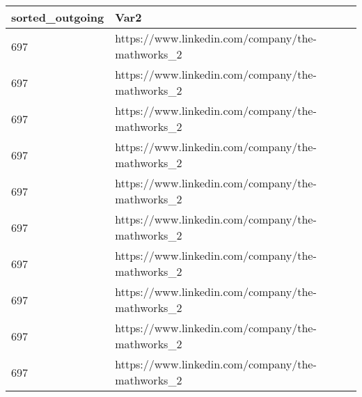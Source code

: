 \begin{tabular}{ll}
sorted_outgoing & Var2 \\ 
\hline 
697 & https://www.linkedin.com/company/the-mathworks_2 \\ 
697 & https://www.linkedin.com/company/the-mathworks_2 \\ 
697 & https://www.linkedin.com/company/the-mathworks_2 \\ 
697 & https://www.linkedin.com/company/the-mathworks_2 \\ 
697 & https://www.linkedin.com/company/the-mathworks_2 \\ 
697 & https://www.linkedin.com/company/the-mathworks_2 \\ 
697 & https://www.linkedin.com/company/the-mathworks_2 \\ 
697 & https://www.linkedin.com/company/the-mathworks_2 \\ 
697 & https://www.linkedin.com/company/the-mathworks_2 \\ 
697 & https://www.linkedin.com/company/the-mathworks_2 \\ 
\hline 
\end{tabular}